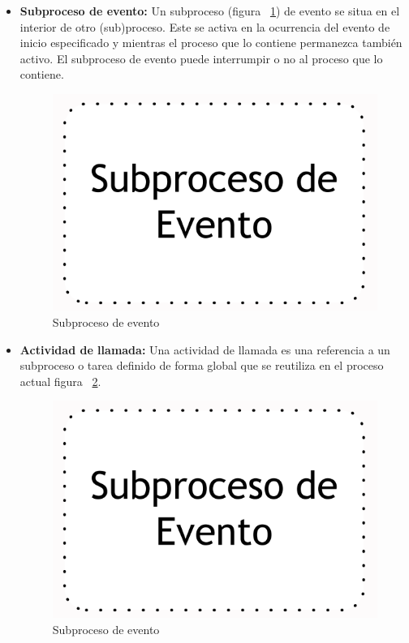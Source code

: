 \begin{itemize}
	
	\item \textbf{Subproceso de evento:} Un subproceso (figura ~\ref{fig:SubPEvento}) de evento se situa en el interior de otro (sub)proceso. Este se activa en la ocurrencia del evento de inicio especificado y mientras el proceso que lo contiene permanezca también activo. El subproceso de evento puede interrumpir o no al proceso que lo contiene.
	
	\begin{figure}[h]
		\centering
		\includegraphics[scale=0.2]{Capitulo2/imagenes/SubPEvento} 
		\caption{Subproceso de evento}
		\label{fig:SubPEvento}
	\end{figure}
	\item \textbf{Actividad de llamada:} Una actividad de llamada es una referencia a un subproceso o tarea definido de forma global que se reutiliza en el proceso actual figura ~\ref{fig:SubPEvento2}.
	\begin{figure}[h]
		\centering
		\includegraphics[scale=0.2]{Capitulo2/imagenes/SubPEvento} 
		\caption{Subproceso de evento}
		\label{fig:SubPEvento2}
	\end{figure}
\end{itemize}

